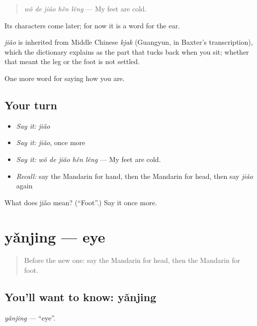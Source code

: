 \begin{quote}
\emph{wǒ de jiǎo hěn lěng} — My feet are cold.
\end{quote}

Its characters come later; for now it is a word for the ear.

\begin{cousinweb}
\emph{jiǎo} is inherited from Middle Chinese \emph{kjak} (Guangyun, in Baxter's transcription), which the dictionary explains as the part that tucks back when you sit; whether that meant the leg or the foot is not settled.
\end{cousinweb}

\begin{grammarlens}[title={What you've built}]
One more word for saying how you are.
\end{grammarlens}

\subsection*{Your turn}
\begin{itemize}
\raggedright
  \item \emph{Say it:} \emph{jiǎo}
  \item \emph{Say it:} \emph{jiǎo}, once more
  \item \emph{Say it:} \emph{wǒ de jiǎo hěn lěng} — My feet are cold.
  \item \emph{Recall:} say the Mandarin for hand, then the Mandarin for head, then say \emph{jiǎo} again
\end{itemize}

\begin{tcolorbox}[breakable,colback=teal!4,colframe=teal!35!black,title={Before you move on}]
What does jiǎo mean? (\textquotedblleft{}Foot\textquotedblright{}.) Say it once more.
\end{tcolorbox}
\section[yǎnjing]{yǎnjing — eye}

\label{lesson:ZH-C52-yanjing}



\begin{quote}
Before the new one: say the Mandarin for head, then the Mandarin for foot.
\end{quote}

\subsection*{You'll want to know: yǎnjing}
\emph{yǎnjing} — \textquotedblleft{}eye\textquotedblright{}.

